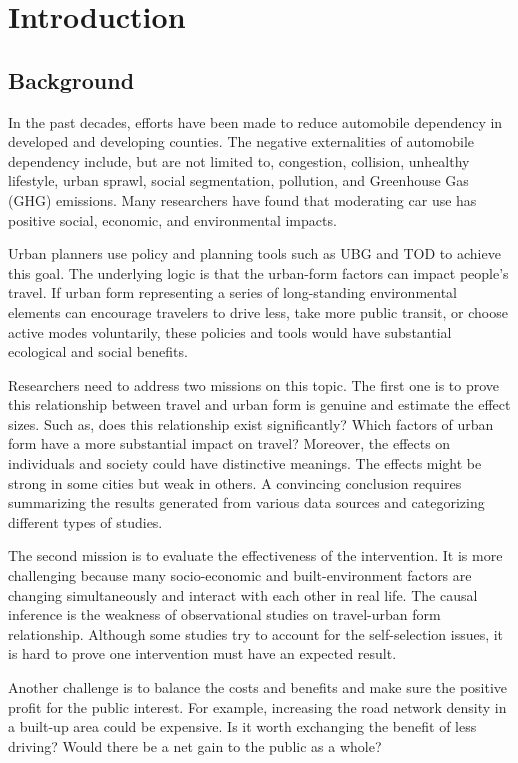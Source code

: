 \documentclass[
  12pt,
]{article}
\begin{document}
\hypertarget{intro}{%
\section{Introduction}\label{intro}}

\hypertarget{background}{%
\subsection{Background}\label{background}}

In the past decades, efforts have been made to reduce automobile dependency in developed and developing counties. The negative externalities of automobile dependency include, but are not limited to, congestion, collision, unhealthy lifestyle, urban sprawl, social segmentation, pollution, and Greenhouse Gas (GHG) emissions. Many researchers have found that moderating car use has positive social, economic, and environmental impacts.

Urban planners use policy and planning tools such as UBG and TOD to achieve this goal. The underlying logic is that the urban-form factors can impact people's travel. If urban form representing a series of long-standing environmental elements can encourage travelers to drive less, take more public transit, or choose active modes voluntarily, these policies and tools would have substantial ecological and social benefits.

Researchers need to address two missions on this topic.
The first one is to prove this relationship between travel and urban form is genuine and estimate the effect sizes.
Such as, does this relationship exist significantly?
Which factors of urban form have a more substantial impact on travel?
Moreover, the effects on individuals and society could have distinctive meanings.
The effects might be strong in some cities but weak in others.
A convincing conclusion requires summarizing the results generated from various data sources and categorizing different types of studies.

The second mission is to evaluate the effectiveness of the intervention.
It is more challenging because many socio-economic and built-environment factors are changing simultaneously and interact with each other in real life.
The causal inference is the weakness of observational studies on travel-urban form relationship.
Although some studies try to account for the self-selection issues, it is hard to prove one intervention must have an expected result.

Another challenge is to balance the costs and benefits and make sure the positive profit for the public interest.
For example, increasing the road network density in a built-up area could be expensive.
Is it worth exchanging the benefit of less driving?
Would there be a net gain to the public as a whole?
\end{document}
